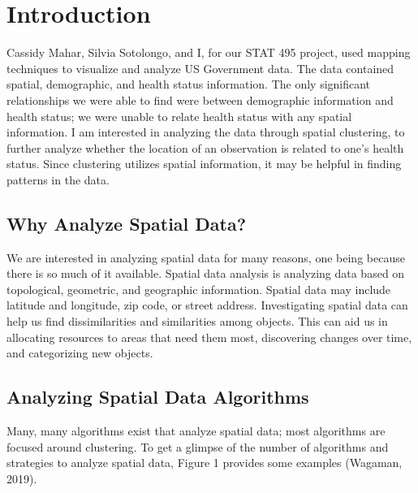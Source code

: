\documentclass[12pt,twoside]{amherstthesis}
\begin{document}
  \onehalfspacing
  
  \chapter*{Introduction}\label{introduction}
  
  Cassidy Mahar, Silvia Sotolongo, and I, for our STAT 495 project, used
  mapping techniques to visualize and analyze US Government data. The data
  contained spatial, demographic, and health status information. The only
  significant relationships we were able to find were between demographic
  information and health status; we were unable to relate health status
  with any spatial information. I am interested in analyzing the data
  through spatial clustering, to further analyze whether the location of
  an observation is related to one's health status. Since clustering
  utilizes spatial information, it may be helpful in finding patterns in
  the data.
  
  \section{Why Analyze Spatial Data?}\label{why-analyze-spatial-data}
  
  We are interested in analyzing spatial data for many reasons, one being
  because there is so much of it available. Spatial data analysis is
  analyzing data based on topological, geometric, and geographic
  information. Spatial data may include latitude and longitude, zip code,
  or street address. Investigating spatial data can help us find
  dissimilarities and similarities among objects. This can aid us in
  allocating resources to areas that need them most, discovering changes
  over time, and categorizing new objects.
  
  \section{Analyzing Spatial Data
  Algorithms}\label{analyzing-spatial-data-algorithms}
  
  Many, many algorithms exist that analyze spatial data; most algorithms
  are focused around clustering. To get a glimpse of the number of
  algorithms and strategies to analyze spatial data, Figure 1 provides
  some examples (Wagaman, 2019).
  
\end{document}
